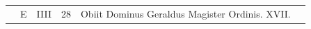 \documentclass[11pt,openany]{book}
\renewcommand{\\}{\par\hspace*{1em}} %
\begin{document}
\begin{center}
\begin{tabular}{l | l | l | r | l l}
\color{Red}  & E & \color{Red} IIII & 28 & Obiit Dominus Geraldus Magister Ordinis. XVII. & \color{Red} \\



\end{tabular}
\end{center}
\end{document}
